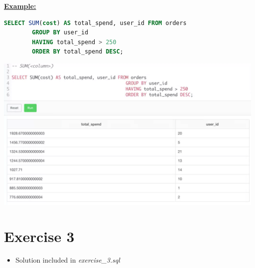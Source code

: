 \documentclass[12pt]{article}
\begin{document}
\begin{itemize}
\begin{itemize}
        \bigskip

        \underline{\textbf{Example:}}

        \bigskip


    \begin{lstlisting}[language=SQL]
    SELECT SUM(cost) AS total_spend, user_id FROM orders
        GROUP BY user_id
        HAVING total_spend > 250
        ORDER BY total_spend DESC;
    \end{lstlisting}

        \bigskip

        \begin{center}
        \includegraphics[width=\linewidth]{images/part_3_notes_3.png}
        \end{center}

    \end{itemize}
\end{itemize}

\bigskip

\section{Exercise 3}

\bigskip

\begin{itemize}
    \item Solution included in \textit{exercise\_3.sql}
\end{itemize}

\bigskip
\end{document}
